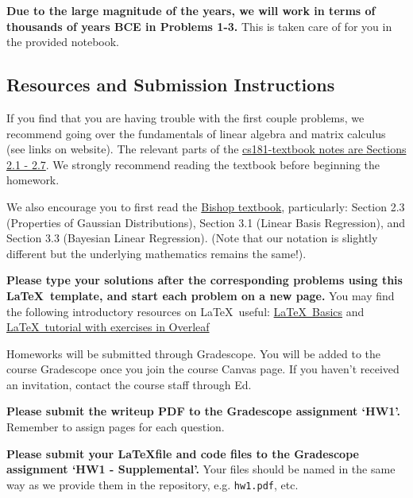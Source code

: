 \documentclass[submit]{harvardml}
\begin{document}
\textbf{Due to the large magnitude of the years, we will work in terms
  of thousands of years BCE in Problems 1-3.} This is taken care of
for you in the provided notebook.






\subsection*{Resources and Submission Instructions}
If you find that you are having trouble with the first couple
problems, we recommend going over the fundamentals of linear algebra
and matrix calculus (see links on website).  The relevant parts of the
\href{https://github.com/harvard-ml-courses/cs181-textbook/blob/master/Textbook.pdf}{cs181-textbook
  notes are Sections 2.1 - 2.7}.  We strongly recommend reading the
textbook before beginning the homework.

We also encourage you to first read the
\href{http://users.isr.ist.utl.pt/~wurmd/Livros/school/Bishop\%20-\%20Pattern\%20Recognition\%20And\%20Machine\%20Learning\%20-\%20Springer\%20\%202006.pdf}{Bishop
  textbook}, particularly: Section 2.3 (Properties of Gaussian
Distributions), Section 3.1 (Linear Basis Regression), and Section 3.3
(Bayesian Linear Regression). (Note that our notation is slightly
different but the underlying mathematics remains the same!).

\textbf{Please type your solutions after the corresponding problems
  using this \LaTeX\ template, and start each problem on a new page.}
You may find the following introductory resources on \LaTeX\ useful:
\href{http://www.mjdenny.com/workshops/LaTeX_Intro.pdf}{\LaTeX\ Basics}
and
\href{https://www.overleaf.com/learn/latex/Free_online_introduction_to_LaTeX_(part_1)}{\LaTeX\ tutorial
  with exercises in Overleaf}

Homeworks will be submitted through Gradescope. You will be added to
the course Gradescope once you join the course Canvas page. If you
haven't received an invitation, contact the course staff through Ed.

\textbf{Please submit the writeup PDF to the Gradescope assignment
  `HW1'.} Remember to assign pages for each question.

\textbf{Please submit your \LaTeX file and code files to the
  Gradescope assignment `HW1 - Supplemental'.} Your files should be
named in the same way as we provide them in the repository,
e.g. \texttt{hw1.pdf}, etc.

\bigskip
\end{document}
